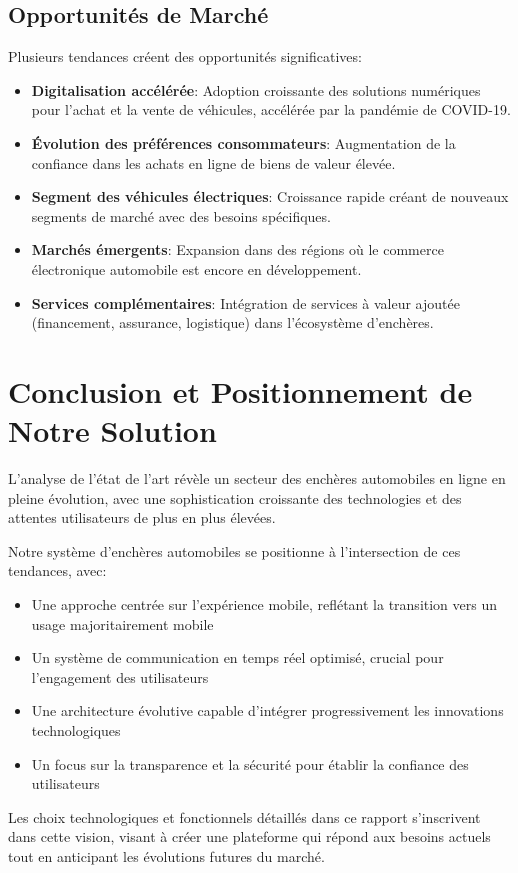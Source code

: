 \subsection{Opportunités de Marché}

Plusieurs tendances créent des opportunités significatives:

\begin{itemize}
    \item \textbf{Digitalisation accélérée}: Adoption croissante des solutions numériques pour l'achat et la vente de véhicules, accélérée par la pandémie de COVID-19.
    
    \item \textbf{Évolution des préférences consommateurs}: Augmentation de la confiance dans les achats en ligne de biens de valeur élevée.
    
    \item \textbf{Segment des véhicules électriques}: Croissance rapide créant de nouveaux segments de marché avec des besoins spécifiques.
    
    \item \textbf{Marchés émergents}: Expansion dans des régions où le commerce électronique automobile est encore en développement.
    
    \item \textbf{Services complémentaires}: Intégration de services à valeur ajoutée (financement, assurance, logistique) dans l'écosystème d'enchères.
\end{itemize}

\section{Conclusion et Positionnement de Notre Solution}

L'analyse de l'état de l'art révèle un secteur des enchères automobiles en ligne en pleine évolution, avec une sophistication croissante des technologies et des attentes utilisateurs de plus en plus élevées.

Notre système d'enchères automobiles se positionne à l'intersection de ces tendances, avec:

\begin{itemize}
    \item Une approche centrée sur l'expérience mobile, reflétant la transition vers un usage majoritairement mobile
    \item Un système de communication en temps réel optimisé, crucial pour l'engagement des utilisateurs
    \item Une architecture évolutive capable d'intégrer progressivement les innovations technologiques
    \item Un focus sur la transparence et la sécurité pour établir la confiance des utilisateurs
\end{itemize} 

Les choix technologiques et fonctionnels détaillés dans ce rapport s'inscrivent dans cette vision, visant à créer une plateforme qui répond aux besoins actuels tout en anticipant les évolutions futures du marché. 